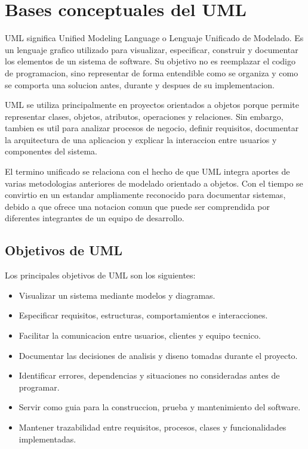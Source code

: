 \documentclass[12pt,letterpaper]{article}
\begin{document}
\section{Bases conceptuales del UML}

UML significa Unified Modeling Language o Lenguaje Unificado de Modelado. Es un lenguaje grafico utilizado para visualizar, especificar, construir y documentar los elementos de un sistema de software. Su objetivo no es reemplazar el codigo de programacion, sino representar de forma entendible como se organiza y como se comporta una solucion antes, durante y despues de su implementacion.

UML se utiliza principalmente en proyectos orientados a objetos porque permite representar clases, objetos, atributos, operaciones y relaciones. Sin embargo, tambien es util para analizar procesos de negocio, definir requisitos, documentar la arquitectura de una aplicacion y explicar la interaccion entre usuarios y componentes del sistema.

El termino unificado se relaciona con el hecho de que UML integra aportes de varias metodologias anteriores de modelado orientado a objetos. Con el tiempo se convirtio en un estandar ampliamente reconocido para documentar sistemas, debido a que ofrece una notacion comun que puede ser comprendida por diferentes integrantes de un equipo de desarrollo.

\subsection{Objetivos de UML}

Los principales objetivos de UML son los siguientes:

\begin{itemize}[leftmargin=1.2cm]
    \item Visualizar un sistema mediante modelos y diagramas.
    \item Especificar requisitos, estructuras, comportamientos e interacciones.
    \item Facilitar la comunicacion entre usuarios, clientes y equipo tecnico.
    \item Documentar las decisiones de analisis y diseno tomadas durante el proyecto.
    \item Identificar errores, dependencias y situaciones no consideradas antes de programar.
    \item Servir como guia para la construccion, prueba y mantenimiento del software.
    \item Mantener trazabilidad entre requisitos, procesos, clases y funcionalidades implementadas.
\end{itemize}
\end{document}
